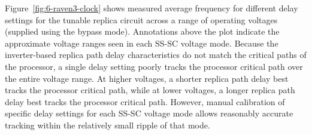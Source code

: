 \documentclass[graybox]{svmult}
\begin{document}
Figure~\ref{fig:6-raven3-clock} shows measured average frequency for different delay settings for the tunable replica circuit across a range of operating voltages (supplied using the bypass mode).
Annotations above the plot indicate the approximate voltage ranges seen in each SS-SC voltage mode.
Because the inverter-based replica path delay characteristics do not match the critical paths of the processor, a single delay setting poorly tracks the processor critical path over the entire voltage range.
At higher voltages, a shorter replica path delay best tracks the processor critical path, while at lower voltages, a longer replica path delay best tracks the processor critical path.
However, manual calibration of specific delay settings for each SS-SC voltage mode allows reasonably accurate tracking within the relatively small ripple of that mode.
\end{document}
